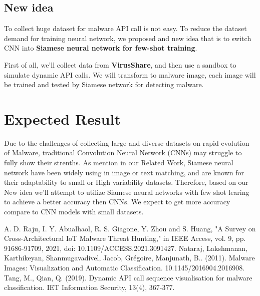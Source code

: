 \documentclass{article}
\begin{document}
\subsection{New idea}
To collect huge dataset for malware API call is not easy. To reduce the dataset demand for training neural network, 
we proposed and new idea that is to switch CNN into \textbf{Siamese neural network for few-shot training}.

First of all, we'll collect data from \textbf{VirusShare}, 
and then use a sandbox to simulate dynamic API calls. We will transform to malware image, each image will be trained and tested by Siamese network for detecting malware.


\section{Expected Result}
Due to the challenges of collecting large and diverse datasets on rapid evolution of Malware, traditional Convolution Neural Network (CNNs) may struggle to fully show their strenths.
As mention in our Related Work, Siamese neural network have been widely using in image or text matching, and are known for their adaptability to small or High variability datasets.
Therefore, based on our New idea we'll attempt to utilize Siamese neural networks with few shot learing to achieve a better accuracy then CNNs.
We expect to get more accuracy compare to CNN models with small datasets.

\begin{thebibliography}{99}
     A. D. Raju, I. Y. Abualhaol, R. S. Giagone, Y. Zhou and S. Huang, "A Survey on Cross-Architectural IoT Malware Threat Hunting," in IEEE Access, vol. 9, pp. 91686-91709, 2021, doi: 10.1109/ACCESS.2021.3091427.
     Nataraj, Lakshmanan, Karthikeyan, Shanmugavadivel, Jacob, Grégoire, Manjunath, B.. (2011). Malware Images: Visualization and Automatic Classification. 10.1145/2016904.2016908. 
     Tang, M., Qian, Q. (2019). Dynamic API call sequence visualisation for malware classification. IET Information Security, 13(4), 367-377.  
\end{thebibliography}
\end{document}
